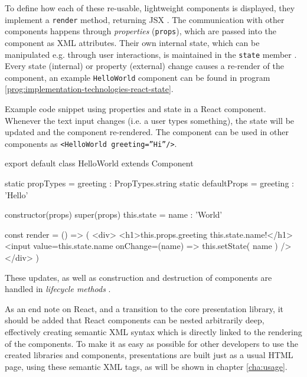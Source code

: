 To define how each of these re-usable, lightweight components is displayed, they implement a \texttt{render} method, returning JSX \cite{jsx}. The communication with other components happens through \emph{properties} (\texttt{props}), which are passed into the component as XML attributes. Their own internal state, which can be manipulated e.g. through user interactions, is maintained in the \texttt{state} member \cite{react-docu}. Every state (internal) or property (external) change causes a re-render of the component, an example \texttt{HelloWorld} component can be found in program \ref{prog:implementation-technologies-react-state}.
%
\begin{program}
\caption{Example code snippet using properties and state in a React component. Whenever the text input changes (i.e. a user types something), the state will be updated and the component re-rendered. The component can be used in other components as \texttt{<HelloWorld greeting=''Hi''/>}.}
\label{prog:implementation-technologies-react-state}
\begin{JsCode}
export default class HelloWorld extends Component {
  static propTypes = { greeting : PropTypes.string }
  static defaultProps = { greeting : 'Hello' }

  constructor(props) {
    super(props)
    this.state = { name : 'World' }
  }

  const render = () => (
    <div>
      <h1>{this.props.greeting} {this.state.name}!</h1>
      <input value={this.state.name} onChange={(name) => this.setState({ name })} />
    </div>
  )
}
\end{JsCode}
\end{program}
%
These updates, as well as construction and destruction of components are handled in \emph{lifecycle methods} \cite{react-docu}.

As an end note on React, and a transition to the core presentation library, it should be added that React components can be nested arbitrarily deep, effectively creating semantic XML syntax which is directly linked to the rendering of the components. To make it as easy as possible for other developers to use the created libraries and components, presentations are built just as a usual HTML page, using these semantic XML tags, as will be shown in chapter \ref{cha:usage}.


